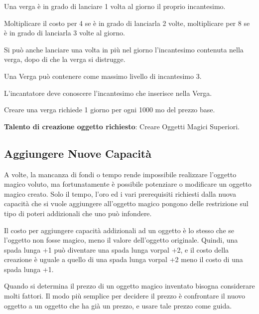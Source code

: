 \begin{multicols}{2}
Una verga è in grado di lanciare 1 volta al giorno il proprio incantesimo.

Moltiplicare il costo per 4 se è in grado di lanciarla 2 volte, moltiplicare per 8 se è in grado di lanciarla 3 volte al giorno.

Si può anche lanciare una volta in più nel giorno l'incantesimo contenuta nella verga, dopo di che la verga si distrugge.

Una Verga può contenere come massimo livello di incantesimo 3.

L'incantatore deve conoscere l'incantesimo che inserisce nella Verga.

Creare una verga richiede 1 giorno per ogni 1000 mo del prezzo base.

\textbf{Talento di creazione oggetto richiesto}: Creare Oggetti Magici Superiori.

\subsection{Aggiungere Nuove Capacità}

A volte, la mancanza di fondi o tempo rende impossibile realizzare l'oggetto magico voluto, ma fortunatamente è possibile potenziare o modificare un oggetto magico creato. Solo il tempo, l'oro ed i vari prerequisiti richiesti dalla nuova capacità che si vuole aggiungere all'oggetto magico pongono delle restrizione sul tipo di poteri addizionali che uno può infondere.

Il costo per aggiungere capacità addizionali ad un oggetto è lo stesso che se l'oggetto non fosse magico, meno il valore dell'oggetto originale. Quindi, una spada lunga +1 può diventare una spada lunga vorpal +2, e il costo della creazione è uguale a quello di una spada lunga vorpal +2 meno il costo di una spada lunga +1.

Quando si determina il prezzo di un oggetto magico inventato bisogna considerare molti fattori. Il modo più semplice per decidere il prezzo è confrontare il nuovo oggetto a un oggetto che ha già un prezzo, e usare tale prezzo come guida.

\end{multicols}

\vfill

